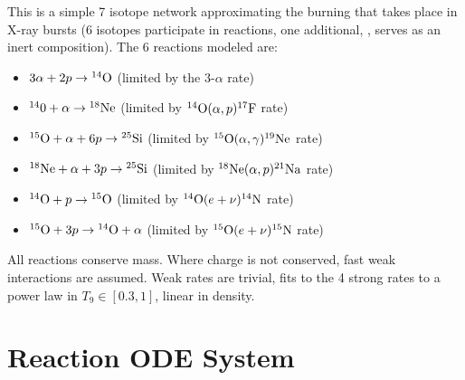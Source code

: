 This is a simple 7 isotope network approximating the burning that
takes place in X-ray bursts (6 isotopes participate in reactions, one
additional, , serves as an inert composition).  The 6 reactions
modeled are:
\begin{itemize}
\item $3\alpha + 2p \rightarrow \isotm{O}{14}$  (limited by the 3-$\alpha$ rate)

\item $\isotm{0}{14} + \alpha \rightarrow \isotm{Ne}{18}$
  (limited by $\isotm{O}{14}(\alpha,p)\isotm{F}{17}$ rate)

\item $\isotm{O}{15} + \alpha + 6 p \rightarrow \isotm{Si}{25}$
  (limited by $\isotm{O}{15}(\alpha,\gamma)\isotm{Ne}{19}$ rate)

\item $\isotm{Ne}{18} + \alpha + 3p \rightarrow \isotm{Si}{25}$
  (limited by $\isotm{Ne}{18}(\alpha,p)\isotm{Na}{21}$ rate)

\item $\isotm{O}{14} + p \rightarrow \isotm{O}{15}$ 
  (limited by $\isotm{O}{14}(e+\nu)\isotm{N}{14}$ rate)

\item $\isotm{O}{15} + 3p \rightarrow \isotm{O}{14} + \alpha$ 
  (limited by $\isotm{O}{15}(e+\nu)\isotm{N}{15}$ rate)
\end{itemize}
All reactions conserve mass.  Where charge is not conserved, fast weak
interactions are assumed.  Weak rates are trivial, fits to the 4
strong rates to a power law in $T_9 \in [0.3, 1]$, linear in density.



\section{Reaction ODE System}

